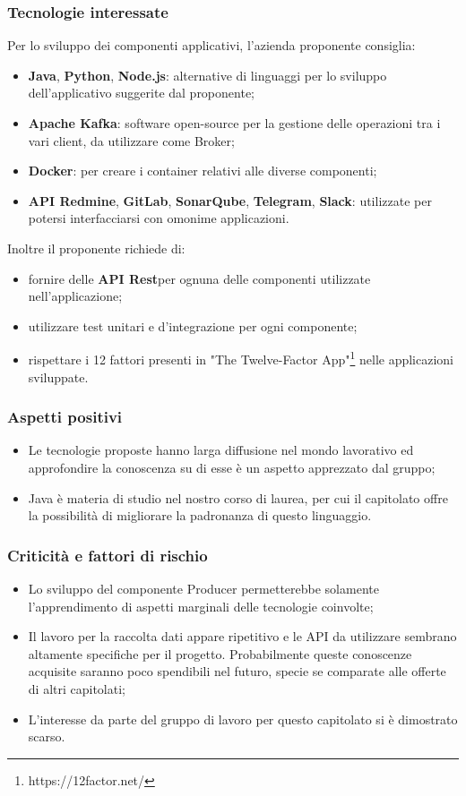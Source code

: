 \subsubsection{Tecnologie interessate}
Per lo sviluppo dei componenti applicativi, l'azienda proponente consiglia:
\begin{itemize}
	\item \textbf{Java}, \textbf{Python}\glo, \textbf{Node.js}\glo: alternative di linguaggi per lo sviluppo dell'applicativo suggerite dal proponente; 
	\item\textbf{Apache Kafka}\glo : software open-source per la gestione delle operazioni tra i vari client, da utilizzare come Broker;
	\item \textbf{Docker}\glo: per creare i container relativi alle diverse componenti;
	\item \textbf{API Redmine}\glo,  \textbf{GitLab}\glo,  \textbf{SonarQube}\glo,  \textbf{Telegram}\glo, \textbf{Slack}\glo: utilizzate per potersi interfacciarsi con omonime applicazioni.
\end{itemize}
Inoltre il proponente richiede di:
\begin{itemize}
	\item fornire delle \textbf{API Rest}\glosp per ognuna delle componenti utilizzate nell'applicazione; 
	\item utilizzare test unitari e d'integrazione per ogni componente; 
	\item rispettare i 12 fattori presenti in "The Twelve-Factor App"\footnote{https://12factor.net/} nelle applicazioni sviluppate.
\end{itemize}
\subsubsection{Aspetti positivi}
\begin{itemize}
	\item Le tecnologie proposte hanno larga diffusione nel mondo lavorativo ed
	 approfondire la conoscenza su di esse è un aspetto apprezzato dal gruppo;
	\item Java è materia di studio nel nostro corso di laurea, per cui il
	 capitolato offre la possibilità di migliorare la padronanza di questo
	 linguaggio.
\end{itemize}

\subsubsection{Criticità e fattori di rischio}
\begin{itemize}
	\item Lo sviluppo del componente Producer permetterebbe solamente l'apprendimento di aspetti marginali delle tecnologie coinvolte;
	\item Il lavoro per la raccolta dati appare ripetitivo 
	 e le API da utilizzare sembrano altamente specifiche per il progetto. Probabilmente queste conoscenze acquisite saranno poco spendibili nel futuro, specie se comparate alle offerte di altri capitolati;
	\item L'interesse da parte del gruppo di lavoro per questo capitolato si è dimostrato scarso.
\end{itemize}

